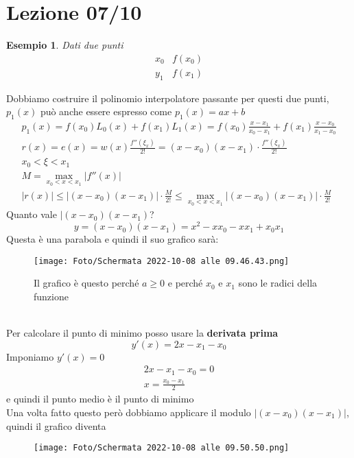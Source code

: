\documentclass[a4paper, portrait]{book}
\numberwithin{equation}{chapter} %
\newtheorem{example}{Esempio}
\begin{document}
\section{Lezione 07/10}
\begin{example}
    Dati due punti 
    $$\begin{matrix}
        x_0&f(x_0)\\
        y_1&f(x_1)
    \end{matrix}$$
\end{example}
Dobbiamo costruire il polinomio interpolatore passante per questi due punti, $p_1(x)$ può anche essere espresso come $p_1(x) = ax + b$
\begin{gather}
    p_1(x) = f(x_0) L_0(x) + f(x_1)L_1(x) = f(x_0)\frac{x-x_1}{x_0 - x_1} + f(x_1) \frac{x-x_0}{x_1-x_0}\\
    r(x) = e(x) = w(x) \frac{f''(\xi_x)}{2!} = (x-x_0)(x-x_1)\cdot \frac{f''(\xi_x)}{2!}\\
    x_0 < \xi < x_1\\
    M = \max_{x_0 < x < x_1}|f''(x)|\\
    |r(x)| \leq |(x-x_0)(x-x_1)|\cdot \frac{M}{2!} \leq \max_{x_0 < x < x_1}|(x-x_0)(x-x_1)|\cdot \frac{M}{2!}
\end{gather} 
Quanto vale $|(x-x_0)(x-x_1)$? 
\begin{equation}
    y = (x-x_0)(x-x_1) = x^2 - xx_0 - xx_1 + x_0x_1
\end{equation}
Questa è una parabola e quindi il suo grafico sarà:
\begin{figure}[h!]
    \centering
    \texttt{[image: Foto/Schermata 2022-10-08 alle 09.46.43.png]}
    \caption{Il grafico è questo perché $a\geq 0$ e perché $x_0$ e $x_1$ sono le radici della funzione}
\end{figure}
\\Per calcolare il punto di minimo posso usare la \textbf{derivata prima}
\begin{equation}
    y'(x) = 2x - x_1 - x_0
\end{equation}
Imponiamo $y'(x) = 0$
\begin{gather}
    2x - x_1 - x_0 = 0\\
    x = \frac{x_0-x_1}{2}
\end{gather}
e quindi il punto medio è il punto di minimo\\
Una volta fatto questo però dobbiamo applicare il modulo $|(x-x_0)(x-x_1)|$, quindi il grafico diventa
\begin{figure}[h!]
    \centering
    \texttt{[image: Foto/Schermata 2022-10-08 alle 09.50.50.png]}
    \caption{}
\end{figure}
\end{document}
